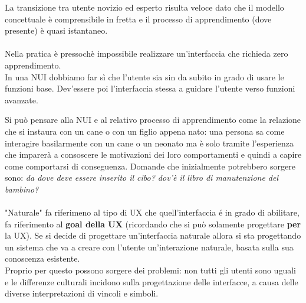 La transizione tra utente novizio ed esperto risulta veloce dato che il modello concettuale è comprensibile in fretta e il processo di apprendimento (dove presente) è quasi istantaneo.
\\
\\Nella pratica è pressochè impossibile realizzare un'interfaccia che richieda zero apprendimento.\\
In una NUI dobbiamo far sì che l'utente sia sin da subito in grado di usare le funzioni base. Dev'essere poi l'interfaccia stessa a guidare l'utente verso funzioni avanzate.

Si può pensare alla NUI e al relativo processo di apprendimento come la relazione che si instaura con un cane o con un figlio appena nato: una persona sa come interagire basilarmente con un cane o un neonato ma è solo tramite l'esperienza che imparerà a consoscere le motivazioni dei loro comportamenti e quindi a capire come comportarsi di conseguenza. Domande che inizialmente potrebbero sorgere sono: \textit{da dove deve essere inserito il cibo? dov'è il libro di manutenzione del bambino?}
\\
\\"Naturale" fa riferimeno al tipo di UX che quell'interfaccia é in grado di abilitare, fa riferimento al \textbf{goal della UX} (ricordando che si può solamente progettare \textbf{per} la UX).
Se si decide di progettare un'interfaccia naturale allora si sta progettando un sistema che va a creare con l'utente un'interazione naturale, basata sulla sua conoscenza esistente.\\
Proprio per questo possono sorgere dei problemi: non tutti gli utenti sono uguali e le differenze culturali incidono sulla progettazione delle interfacce, a causa delle diverse interpretazioni di vincoli e simboli.\\

